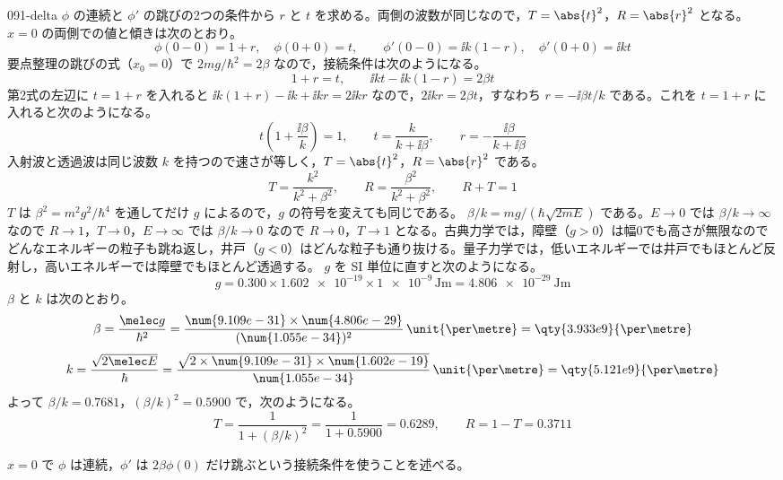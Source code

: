 \documentclass[uplatex,dvipdfmx,a4paper,11pt]{jsarticle}
\begin{document}
\begin{kaisetsu}{091-delta}
\houshin $\phi$ の連続と $\phi'$ の跳びの2つの条件から $r$ と $t$ を求める。両側の波数が同じなので，$T=\abs{t}^{2}$，$R=\abs{r}^{2}$ となる。
\keisan
{} $x=0$ の両側での値と傾きは次のとおり。
\[ \phi(0-0)=1+r,\quad \phi(0+0)=t,\qquad \phi'(0-0)=\ii k(1-r),\quad \phi'(0+0)=\ii kt \]
要点整理の跳びの式（$x_{0}=0$）で $2mg/\hbar^{2}=2\beta$ なので，接続条件は次のようになる。
\[ 1+r=t,\qquad \ii kt-\ii k(1-r)=2\beta t \]
第2式の左辺に $t=1+r$ を入れると $\ii k(1+r)-\ii k+\ii kr=2\ii kr$ なので，$2\ii kr=2\beta t$，すなわち $r=-\ii\beta t/k$ である。これを $t=1+r$ に入れると次のようになる。
\[ t\left(1+\frac{\ii\beta}{k}\right)=1,\qquad t=\frac{k}{k+\ii\beta},\qquad r=-\frac{\ii\beta}{k+\ii\beta} \]
 入射波と透過波は同じ波数 $k$ を持つので速さが等しく，$T=\abs{t}^{2}$，$R=\abs{r}^{2}$ である。
\[ T=\frac{k^{2}}{k^{2}+\beta^{2}},\qquad R=\frac{\beta^{2}}{k^{2}+\beta^{2}},\qquad R+T=1 \]
$T$ は $\beta^{2}=m^{2}g^{2}/\hbar^{4}$ を通してだけ $g$ によるので，$g$ の符号を変えても同じである。
 $\beta/k=mg/(\hbar\sqrt{2mE})$ である。$E\to 0$ では $\beta/k\to\infty$ なので $R\to 1$，$T\to 0$，$E\to\infty$ では $\beta/k\to 0$ なので $R\to 0$，$T\to 1$ となる。古典力学では，障壁（$g>0$）は幅0でも高さが無限なのでどんなエネルギーの粒子も跳ね返し，井戸（$g<0$）はどんな粒子も通り抜ける。量子力学では，低いエネルギーでは井戸でもほとんど反射し，高いエネルギーでは障壁でもほとんど透過する。
 $g$ を SI 単位に直すと次のようになる。
\[ g=\num{0.300}\times\num{1.602e-19}\times\num{1e-9}\,\unit{\joule\metre}=\qty{4.806e-29}{\joule\metre} \]
$\beta$ と $k$ は次のとおり。
\[ \beta=\frac{\melec g}{\hbar^{2}}=\frac{\num{9.109e-31}\times\num{4.806e-29}}{(\num{1.055e-34})^{2}}\,\unit{\per\metre}=\qty{3.933e9}{\per\metre} \]
\[ k=\frac{\sqrt{2\melec E}}{\hbar}=\frac{\sqrt{2\times\num{9.109e-31}\times\num{1.602e-19}}}{\num{1.055e-34}}\,\unit{\per\metre}=\qty{5.121e9}{\per\metre} \]
よって $\beta/k=\num{0.7681}$，$(\beta/k)^{2}=\num{0.5900}$ で，次のようになる。
\[ T=\frac{1}{1+(\beta/k)^{2}}=\frac{1}{1+\num{0.5900}}=\num{0.6289},\qquad R=1-T=\num{0.3711} \]
\begin{ronten}
  \item {} $x=0$ で $\phi$ は連続，$\phi'$ は $2\beta\phi(0)$ だけ跳ぶという接続条件を使うことを述べる。

\end{ronten}
\end{kaisetsu}
\end{document}

